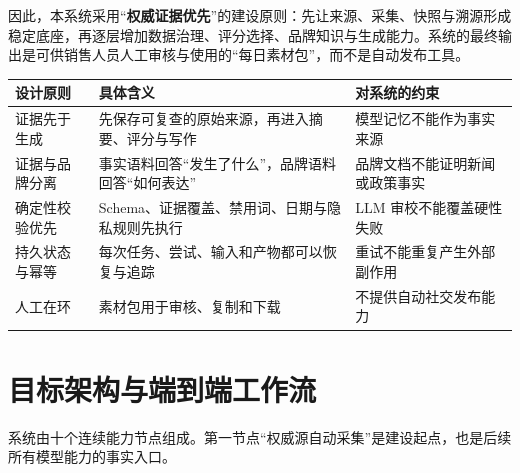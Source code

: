 \documentclass[UTF8,11pt,a4paper,fontset=none]{ctexart}
\begin{document}
因此，本系统采用“\textbf{权威证据优先}”的建设原则：先让来源、采集、快照与溯源形成稳定底座，再逐层增加数据治理、评分选择、品牌知识与生成能力。系统的最终输出是可供销售人员人工审核与使用的“每日素材包”，而不是自动发布工具。

\noindent\begin{tabularx}{\textwidth}{L{3.2cm}YY}
\toprule
{}
\color{white}\bfseries\sffamily 设计原则 &
\color{white}\bfseries\sffamily 具体含义 &
\color{white}\bfseries\sffamily 对系统的约束 \\
\midrule
证据先于生成 & 先保存可复查的原始来源，再进入摘要、评分与写作 & 模型记忆不能作为事实来源 \\
证据与品牌分离 & 事实语料回答“发生了什么”，品牌语料回答“如何表达” & 品牌文档不能证明新闻或政策事实 \\
确定性校验优先 & Schema、证据覆盖、禁用词、日期与隐私规则先执行 & LLM 审校不能覆盖硬性失败 \\
持久状态与幂等 & 每次任务、尝试、输入和产物都可以恢复与追踪 & 重试不能重复产生外部副作用 \\
人工在环 & 素材包用于审核、复制和下载 & 不提供自动社交发布能力 \\
\bottomrule
\end{tabularx}

\section{目标架构与端到端工作流}

系统由十个连续能力节点组成。第一节点“权威源自动采集”是建设起点，也是后续所有模型能力的事实入口。
\end{document}
